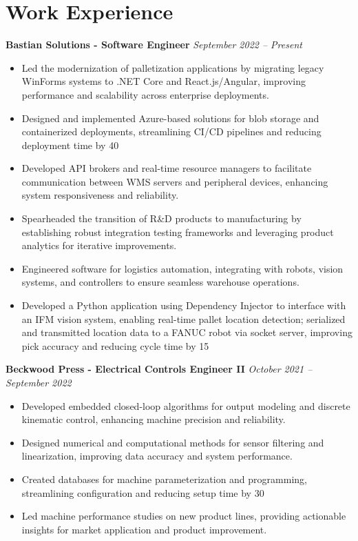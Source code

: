 \documentclass[letterpaper,10pt]{article} %
\newcommand{\job}[3]{
\textbf{#1 - #2} \hfill \textit{#3}
}
\begin{document}
\section{Work Experience}
\noindent\job{Bastian Solutions}{Software Engineer}{September 2022 -- Present}
\begin{itemize}[left=2em]
    \item Led the modernization of palletization applications by migrating legacy WinForms systems to .NET Core and React.js/Angular, improving performance and scalability across enterprise deployments.
    \item Designed and implemented Azure-based solutions for blob storage and containerized deployments, streamlining CI/CD pipelines and reducing deployment time by 40%
    \item Developed API brokers and real-time resource managers to facilitate communication between WMS servers and peripheral devices, enhancing system responsiveness and reliability.
    \item Spearheaded the transition of R&D products to manufacturing by establishing robust integration testing frameworks and leveraging product analytics for iterative improvements.
    \item Engineered software for logistics automation, integrating with robots, vision systems, and controllers to ensure seamless warehouse operations.
    \item Developed a Python application using Dependency Injector to interface with an IFM vision system, enabling real-time pallet location detection; serialized and transmitted location data to a FANUC robot via socket server, improving pick accuracy and reducing cycle time by 15%
\end{itemize}

\noindent\job{Beckwood Press}{Electrical Controls Engineer II}{October 2021 – September 2022}
\begin{itemize}[left=2em]
    \item Developed embedded closed-loop algorithms for output modeling and discrete kinematic control, enhancing machine precision and reliability.
    \item Designed numerical and computational methods for sensor filtering and linearization, improving data accuracy and system performance.
    \item Created databases for machine parameterization and programming, streamlining configuration and reducing setup time by 30%
    \item Led machine performance studies on new product lines, providing actionable insights for market application and product improvement.
\end{itemize}
\end{document}
